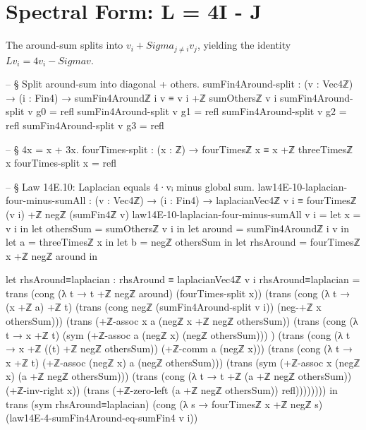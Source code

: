 \documentclass[11pt,a4paper]{book}
\def\Sigma{Sigma}%
\def\texorpdfstring#1#2{#2}%
\begin{document}
\section{Spectral Form: \texorpdfstring{$L = 4I - J$}{L = 4I - J}}

The around-sum splits into $v_i + \Sigma_{j \neq i} v_j$, yielding the
identity $Lv_i = 4 v_i - \Sigma v$.

\begin{code}
-- § Split around-sum into diagonal + others.
sumFin4Around-split : (v : Vec4ℤ) → (i : Fin4) →
  sumFin4Aroundℤ i v ≡ v i +ℤ sumOthersℤ v i
sumFin4Around-split v g0 = refl
sumFin4Around-split v g1 = refl
sumFin4Around-split v g2 = refl
sumFin4Around-split v g3 = refl

-- § 4x = x + 3x.
fourTimes-split : (x : ℤ) → fourTimesℤ x ≡ x +ℤ threeTimesℤ x
fourTimes-split x = refl

-- § Law 14E.10: Laplacian equals 4·vᵢ minus global sum.
law14E-10-laplacian-four-minus-sumAll : (v : Vec4ℤ) → (i : Fin4) →
  laplacianVec4ℤ v i ≡ fourTimesℤ (v i) +ℤ negℤ (sumFin4ℤ v)
law14E-10-laplacian-four-minus-sumAll v i =
  let x = v i in
  let othersSum = sumOthersℤ v i in
  let around = sumFin4Aroundℤ i v in
  let a = threeTimesℤ x in
  let b = negℤ othersSum in
  let rhsAround = fourTimesℤ x +ℤ negℤ around in

  let rhsAround≡laplacian : rhsAround ≡ laplacianVec4ℤ v i
      rhsAround≡laplacian =
        trans
          (cong (λ t → t +ℤ negℤ around) (fourTimes-split x))
          (trans
            (cong (λ t → (x +ℤ a) +ℤ t) (trans (cong negℤ (sumFin4Around-split v i)) (neg-+ℤ x othersSum)))
            (trans
              (+ℤ-assoc x a (negℤ x +ℤ negℤ othersSum))
              (trans
                (cong (λ t → x +ℤ t) (sym (+ℤ-assoc a (negℤ x) (negℤ othersSum)))
                )
                (trans
                  (cong (λ t → x +ℤ ((t) +ℤ negℤ othersSum)) (+ℤ-comm a (negℤ x)))
                  (trans
                    (cong (λ t → x +ℤ t) (+ℤ-assoc (negℤ x) a (negℤ othersSum)))
                    (trans
                      (sym (+ℤ-assoc x (negℤ x) (a +ℤ negℤ othersSum)))
                      (trans
                        (cong (λ t → t +ℤ (a +ℤ negℤ othersSum)) (+ℤ-inv-right x))
                        (trans
                          (+ℤ-zero-left (a +ℤ negℤ othersSum))
                          refl))))))))
  in
  trans
    (sym rhsAround≡laplacian)
    (cong (λ s → fourTimesℤ x +ℤ negℤ s) (law14E-4-sumFin4Around-eq-sumFin4 v i))
\end{code}
\end{document}
